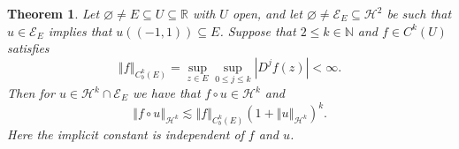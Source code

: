 \documentclass[11pt,reqno]{amsart}
\numberwithin{equation}{section}
\providecommand{\abs}[1]{\left\vert#1\right\vert}
\providecommand{\norm}[1]{\left\Vert#1\right\Vert}
\def\ls{\lesssim}
\providecommand{\abs}[1]{\left\vert#1\right\vert}
\providecommand{\norm}[1]{\left\Vert#1\right\Vert}
\def\ls{\lesssim}
\def\h{\mathcal{H}}
\def\N{\mathbb{N}}
\def\R{\mathbb{R}}
\newtheorem{thm}[lem]{Theorem}
\begin{document}
\begin{thm}\label{hk_composition}
Let $\varnothing \neq E \subseteq U \subseteq \R$ with $U$ open, and let $\varnothing \neq \mathcal{E}_E \subseteq \h^2$ be such that $u \in \mathcal{E}_E$ implies that $u((-1,1)) \subseteq E$.  Suppose that $2 \le k\in \N$ and $f \in C^k(U)$ satisfies 
\begin{equation}
 \norm{f}_{C^k_b(E)} = \sup_{z \in E} \sup_{0 \le j \le k} \abs{D^j f(z)} < \infty.
\end{equation}
Then for  $u \in \h^k \cap \mathcal{E}_E$ we have that $f \circ u \in \h^k$ and 
\begin{equation}
 \norm{f\circ u}_{\h^k} \ls \norm{f}_{C^k_b(E)}  (1+\norm{u}_{\h^k})^k.
\end{equation}
Here the implicit constant is independent of $f$ and $u$.
\end{thm}
\end{document}
